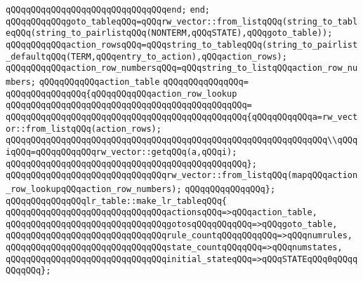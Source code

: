 \verb|qQQqqQQqqQQqqQQqqQQqqQQqqQQqqQQqend;|\newline
\verb|end;|\newline
\newline
\verb|qQQqqQQqqQQqgoto_tableqQQq=qQQqrw_vector::from_listqQQq(string_to_tableqQQq(string_to_pairlistqQQq(NONTERM,qQQqSTATE),qQQqgoto_table));|\newline
\verb|qQQqqQQqqQQqaction_rowsqQQq=qQQqstring_to_tableqQQq(string_to_pairlist_defaultqQQq(TERM,qQQqentry_to_action),qQQqaction_rows);|\newline
\verb|qQQqqQQqqQQqaction_row_numbersqQQq=qQQqstring_to_listqQQqaction_row_numbers;|\newline
\verb|qQQqqQQqqQQqaction_table|\newline
\verb|qQQqqQQqqQQqqQQq=|\newline
\verb|qQQqqQQqqQQqqQQq{qQQqqQQqqQQqaction_row_lookup|\newline
\verb|qQQqqQQqqQQqqQQqqQQqqQQqqQQqqQQqqQQqqQQqqQQqqQQq=|\newline
\verb|qQQqqQQqqQQqqQQqqQQqqQQqqQQqqQQqqQQqqQQqqQQqqQQq{qQQqqQQqqQQqa=rw_vector::from_listqQQq(action_rows);|\newline
\newline
\verb|qQQqqQQqqQQqqQQqqQQqqQQqqQQqqQQqqQQqqQQqqQQqqQQqqQQqqQQqqQQqqQQq\\qQQqiqQQq=qQQqqQQqqQQqrw_vector::getqQQq(a,qQQqi);|\newline
\verb|qQQqqQQqqQQqqQQqqQQqqQQqqQQqqQQqqQQqqQQqqQQqqQQq};|\newline
\newline
\verb|qQQqqQQqqQQqqQQqqQQqqQQqqQQqqQQqrw_vector::from_listqQQq(mapqQQqaction_row_lookupqQQqaction_row_numbers);|\newline
\verb|qQQqqQQqqQQqqQQq};|\newline
\newline
\verb|qQQqqQQqqQQqqQQqlr_table::make_lr_tableqQQq{|\newline
\verb|qQQqqQQqqQQqqQQqqQQqqQQqqQQqqQQqactionsqQQq=>qQQqaction_table,|\newline
\verb|qQQqqQQqqQQqqQQqqQQqqQQqqQQqqQQqgotosqQQqqQQqqQQq=>qQQqgoto_table,|\newline
\verb|qQQqqQQqqQQqqQQqqQQqqQQqqQQqqQQqrule_countqQQqqQQqqQQq=>qQQqnumrules,|\newline
\verb|qQQqqQQqqQQqqQQqqQQqqQQqqQQqqQQqstate_countqQQqqQQq=>qQQqnumstates,|\newline
\verb|qQQqqQQqqQQqqQQqqQQqqQQqqQQqqQQqinitial_stateqQQq=>qQQqSTATEqQQq0qQQqqQQqqQQq};|\newline
